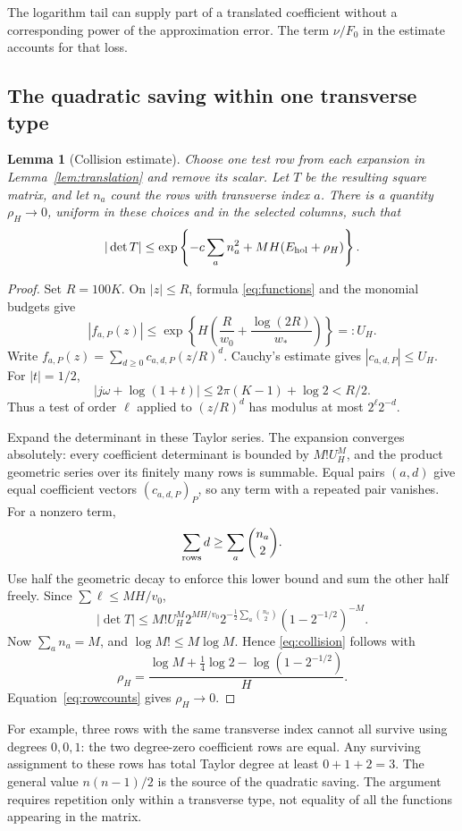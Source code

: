 \documentclass[11pt]{article}
\newtheorem{lemma}[theorem]{Lemma}
\theoremstyle{definition}
\theoremstyle{remark}
\numberwithin{equation}{section}
\begin{document}
The logarithm tail can supply part of a translated coefficient
without a corresponding power of the approximation error. The term
\(\nu/F_0\) in the estimate accounts for that loss.

\subsection{The quadratic saving within one transverse type}
\begin{lemma}[Collision estimate]\label{lem:collision}
Choose one test row from each expansion in Lemma~\ref{lem:translation}
and remove its scalar. Let \(T\) be the resulting square matrix, and
let \(n_a\) count the rows with transverse index \(a\). There is a
quantity \(\rho_H\to0\), uniform in these choices and in the selected
columns, such that
\begin{equation}\label{eq:collision}
 |\det T|\le
 \exp\left\{-c\sum_a n_a^2+MH(E_{\rm hol}+\rho_H)\right\}.
\end{equation}
\end{lemma}
\begin{proof}
Set \(R=100K\). On \(|z|\le R\), formula \eqref{eq:functions}
and the monomial budgets give
\[
 |f_{a,P}(z)|\le
 \exp\left\{H\left(\frac R{w_0}+\frac{\log(2R)}{w_*}\right)\right\}
 =:U_H.
\]
Write \(f_{a,P}(z)=\sum_{d\ge0}c_{a,d,P}(z/R)^d\).
Cauchy's estimate gives \(|c_{a,d,P}|\le U_H\).
For \(|t|=1/2\),
\[
 |j\omega+\log(1+t)|\le2\pi(K-1)+\log2<R/2.
\]
Thus a test of order \(\ell\) applied to \((z/R)^d\) has modulus
at most \(2^\ell2^{-d}\).

Expand the determinant in these Taylor series. The expansion converges
absolutely: every coefficient determinant is bounded by
\(M!U_H^M\), and the product geometric series over its
finitely many rows is summable. Equal pairs \((a,d)\) give equal
coefficient vectors \((c_{a,d,P})_P\), so any term with a repeated
pair vanishes. For a nonzero term,
\[
 \sum_{\rm rows}d\ge\sum_a\binom{n_a}{2}.
\]
Use half the geometric decay to enforce this lower bound and sum the
other half freely. Since \(\sum\ell\le MH/v_0\),
\[
 |\det T|\le M!U_H^M2^{MH/v_0}
 2^{-\frac12\sum_a\binom{n_a}{2}}(1-2^{-1/2})^{-M}.
\]
Now \(\sum_an_a=M\), and \(\log M!\le M\log M\). Hence
\eqref{eq:collision} follows with
\[
 \rho_H=\frac{\log M+\frac14\log2-\log(1-2^{-1/2})}{H}.
\]
Equation~\eqref{eq:rowcounts} gives \(\rho_H\to0\).
\end{proof}

For example, three rows with the same transverse index cannot all
survive using degrees \(0,0,1\): the two degree-zero coefficient
rows are equal. Any surviving assignment to these rows has total
Taylor degree at least \(0+1+2=3\).
The general value \(n(n-1)/2\) is the source of the quadratic saving.
The argument requires repetition only within a transverse type,
not equality of all the functions appearing in the matrix.
\end{document}
